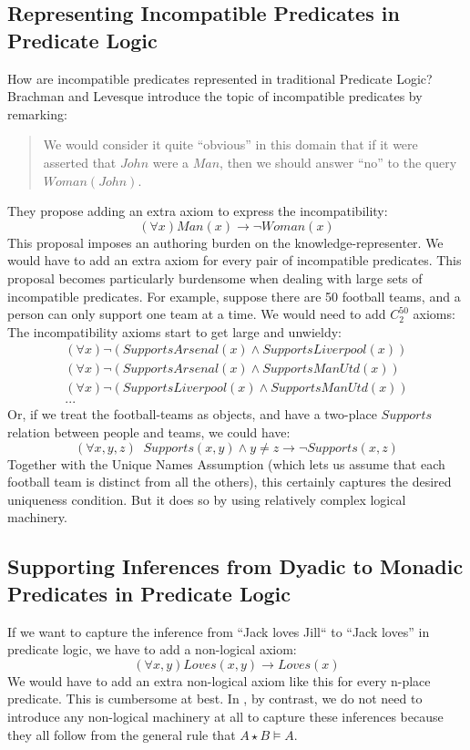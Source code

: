 \subsection{Representing Incompatible Predicates in Predicate Logic}
How are incompatible predicates represented in traditional Predicate Logic?
Brachman and Levesque\cite{brachman} introduce the topic of incompatible predicates by remarking:
\begin{quote}
We would consider it quite ``obvious'' in this domain that if it were asserted that $John$ were a $Man$, then we should answer ``no'' to the query $Woman(John)$.
\end{quote}
They propose adding an extra axiom to express the incompatibility:
\[
(\forall x) Man(x) \rightarrow \neg Woman(x)
\]   
This proposal imposes an authoring burden on the knowledge-representer.
We would have to add an extra axiom for every pair of incompatible predicates.
This proposal becomes particularly burdensome when dealing with large sets of incompatible predicates. 
For example, suppose there are 50 football teams, and a person can only support one team at a time. 
We would need to add $C^{50}_2$ axioms:
The incompatibility axioms start to get large and unwieldy:
\begin{eqnarray}
(\forall x) \neg (SupportsArsenal(x) \land SupportsLiverpool(x)) \nonumber \\
(\forall x) \neg (SupportsArsenal(x) \land SupportsManUtd(x)) \nonumber \\
(\forall x) \neg (SupportsLiverpool(x) \land SupportsManUtd(x)) \nonumber \\
... \nonumber
\end{eqnarray}   
Or, if we treat the football-teams as objects, and have a two-place $Supports$ relation between people and teams, we could have:
\[
(\forall x,y,z) \; \; Supports(x,y) \land y \neq z \rightarrow \neg Supports(x,z)
\]   
Together with the Unique Names Assumption (which lets us assume that each football team is distinct from all the others), this certainly captures the desired uniqueness condition.
But it does so by using relatively complex logical machinery.

\subsection{Supporting Inferences from Dyadic to Monadic Predicates in Predicate Logic}
If we want to capture the inference from ``Jack loves Jill`` to ``Jack loves'' in predicate logic, we have to add a non-logical axiom:
\[
(\forall x, y) Loves(x,y) \rightarrow Loves(x)
\]
We would have to add an extra non-logical axiom like this for every n-place predicate.
This is cumbersome at best. 
In \ELABR{}, by contrast, we do not need to introduce any non-logical machinery at all to capture these inferences because they all follow from the general rule that $A \star B \models A$.


